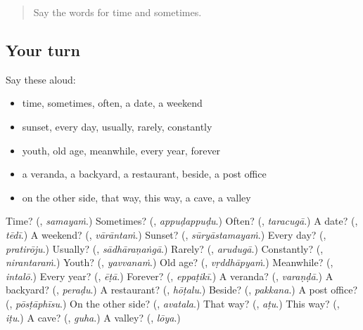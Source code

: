 \label{lesson:TE-R174-second-pass-words-from-chapters-170-174}



\begin{quote}
Say the words for time and sometimes.
\end{quote}

\subsection*{Your turn}
Say these aloud:

\begin{itemize}
\raggedright
  \item time, sometimes, often, a date, a weekend
  \item sunset, every day, usually, rarely, constantly
  \item youth, old age, meanwhile, every year, forever
  \item a veranda, a backyard, a restaurant, beside, a post office
  \item on the other side, that way, this way, a cave, a valley
\end{itemize}

\begin{tcolorbox}[breakable,colback=teal!4,colframe=teal!35!black,title={Before you move on}]
Time? (\textbf{}, \emph{samayaṁ}.) Sometimes? (\textbf{}, \emph{appuḍappuḍu}.) Often? (\textbf{}, \emph{taracugā}.) A date? (\textbf{}, \emph{tēdī}.) A weekend? (\textbf{}, \emph{vārāntaṁ}.) Sunset? (\textbf{}, \emph{sūryāstamayaṁ}.) Every day? (\textbf{}, \emph{pratirōju}.) Usually? (\textbf{}, \emph{sādhāraṇaṅgā}.) Rarely? (\textbf{}, \emph{arudugā}.) Constantly? (\textbf{}, \emph{nirantaraṁ}.) Youth? (\textbf{}, \emph{yavvanaṁ}.) Old age? (\textbf{}, \emph{vṛddhāpyaṁ}.) Meanwhile? (\textbf{}, \emph{intalō}.) Every year? (\textbf{}, \emph{ēṭā}.) Forever? (\textbf{}, \emph{eppaṭikī}.) A veranda? (\textbf{}, \emph{varaṇḍā}.) A backyard? (\textbf{}, \emph{peraḍu}.) A restaurant? (\textbf{}, \emph{hōṭalu}.) Beside? (\textbf{}, \emph{pakkana}.) A post office? (\textbf{}, \emph{pōsṭāphīsu}.) On the other side? (\textbf{}, \emph{avatala}.) That way? (\textbf{}, \emph{aṭu}.) This way? (\textbf{}, \emph{iṭu}.) A cave? (\textbf{}, \emph{guha}.) A valley? (\textbf{}, \emph{lōya}.)
\end{tcolorbox}
